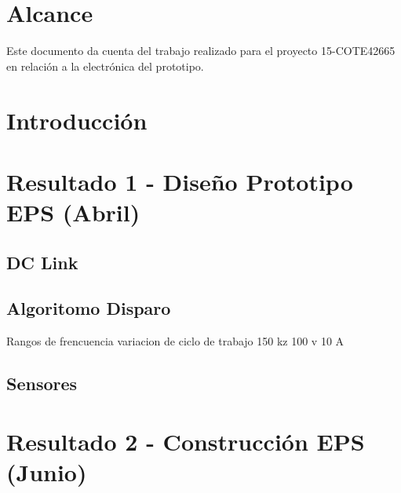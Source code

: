\documentclass[12pt,twoside,onecolumn]{article}
\begin{document}
 
 
\newpage 
\section{Alcance}
Este documento da cuenta del trabajo realizado para el proyecto 15-COTE42665 en relación a la electrónica del prototipo.

\section{Introducción}

\section{Resultado 1 - Diseño Prototipo EPS (Abril)} %

\subsection{DC Link}

\subsection{Algoritomo Disparo}
Rangos de frencuencia
variacion de ciclo de trabajo 
150 kz 100 v 10 A

\subsection{Sensores}


\section{Resultado 2 - Construcción EPS (Junio)} %
\end{document}

